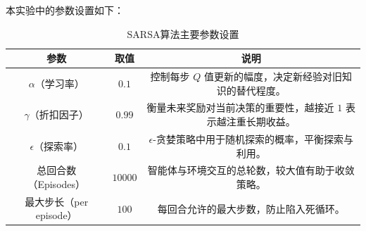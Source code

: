 本实验中的参数设置如下：
\begin{table}[htbp]
\centering
\caption{SARSA算法主要参数设置}
\label{tab:sarsa_three_line}
\begin{tabular}{ccc}
\toprule
\textbf{参数} & \textbf{取值} & \textbf{说明} \\
\midrule
\(\alpha\)（学习率） & \(0.1\) & 控制每步 \(Q\) 值更新的幅度，决定新经验对旧知识的替代程度。 \\
\(\gamma\)（折扣因子） & \(0.99\) & 衡量未来奖励对当前决策的重要性，越接近 \(1\) 表示越注重长期收益。 \\
\(\epsilon\)（探索率） & \(0.1\) & \(\epsilon\)-贪婪策略中用于随机探索的概率，平衡探索与利用。 \\
总回合数（Episodes） & \(10000\) & 智能体与环境交互的总轮数，较大值有助于收敛策略。 \\
最大步长（per episode） & \(100\) & 每回合允许的最大步数，防止陷入死循环。 \\
\bottomrule
\end{tabular}
\end{table}